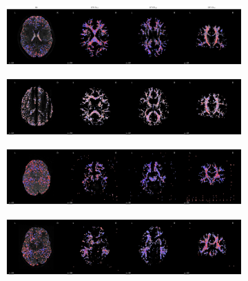 \documentclass[fleqn,10pt,inline]{wlscirep}
\begin{document}
\begin{figure}[tbp]
    \centering
    \begin{subfigure}{\dimexpr\linewidth-3.5em\relax}
    \centering
    \includegraphics[width=\linewidth]{deep-learning-qc/attribution-maps-true-pos.pdf}
    \end{subfigure}
    \begin{subfigure}{\dimexpr\linewidth-3.5em\relax}
    \centering
    \includegraphics[width=\linewidth]{deep-learning-qc/attribution-maps-true-neg.pdf}
    \end{subfigure}
    \begin{subfigure}{\dimexpr\linewidth-3.5em\relax}
    \centering
    \includegraphics[width=\linewidth]{deep-learning-qc/attribution-maps-false-pos.pdf}
    \end{subfigure}
    \begin{subfigure}{\dimexpr\linewidth-3.5em\relax}
    \centering
    \includegraphics[width=\linewidth]{deep-learning-qc/attribution-maps-false-neg.pdf}

\end{subfigure}
\end{figure}
\end{document}
